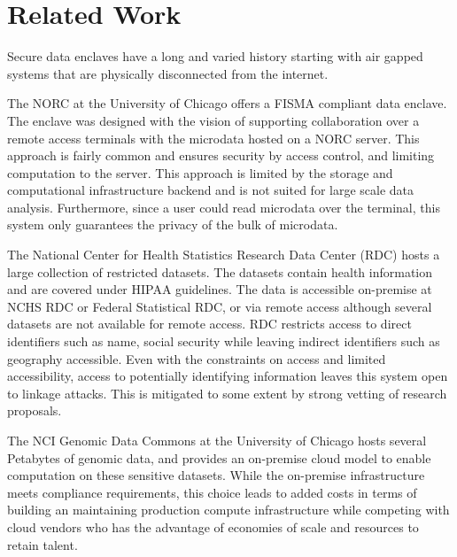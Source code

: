 \section{Related Work}

Secure data enclaves have a long and varied history starting with air gapped systems that are physically
disconnected from the internet. 



The NORC \cite{lane2008using} at the University of Chicago offers a FISMA compliant data enclave. The enclave
was designed with the vision of supporting collaboration over a remote access terminals with the microdata hosted
on a NORC server. This approach is fairly common and ensures security by access control, and limiting computation
to the server. This approach is limited by the storage and computational infrastructure backend and is not
suited for large scale data analysis. Furthermore, since a user could read microdata over the terminal, this
system only guarantees the privacy of the bulk of microdata.

The National Center for Health Statistics Research Data Center (RDC) \cite{cdc} hosts a large collection of
restricted datasets. The datasets contain health information and are covered under HIPAA guidelines.
The data is accessible on-premise at NCHS RDC or Federal Statistical RDC, or via remote access although
several datasets are not available for remote access. RDC restricts access to direct identifiers such as name,
social security while leaving indirect identifiers such as geography accessible. Even with the constraints
on access and limited accessibility, access to potentially identifying information leaves this system open to
linkage attacks. This is mitigated to some extent by strong vetting of research proposals.

The NCI Genomic Data Commons \cite{grossman2016toward} at the University of Chicago hosts several Petabytes of
genomic data, and provides an on-premise cloud model to enable computation on these sensitive datasets.
While the on-premise infrastructure meets compliance requirements, this choice leads to added costs in terms of
building an maintaining production compute infrastructure while competing with cloud vendors who has the advantage
of economies of scale and resources to retain talent.




